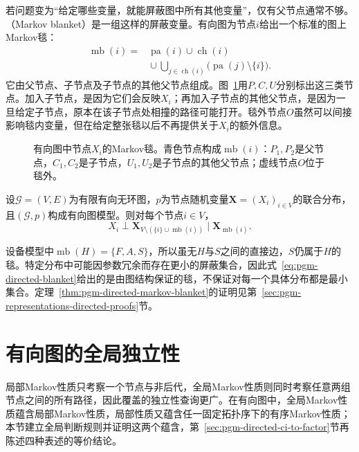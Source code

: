 若问题变为“给定哪些变量，就能屏蔽图中所有其他变量”，仅有父节点通常不够。（Markov blanket）是一组这样的屏蔽变量。有向图为节点$i$给出一个标准的图上Markov毯：
\begin{equation}
  \begin{aligned}
    \operatorname{mb}(i)
    ={}&\operatorname{pa}(i)\cup\operatorname{ch}(i)\\
       &{}\cup\bigcup_{j\in\operatorname{ch}(i)}
           \bigl(\operatorname{pa}(j)\setminus\{i\}\bigr).
  \end{aligned}
  \label{eq:pgm-directed-blanket}
\end{equation}
它由父节点、子节点及子节点的其他父节点组成。图~\ref{fig:pgm-directed-markov-blanket}用$P,C,U$分别标出这三类节点。加入子节点，是因为它们会反映$X_i$；再加入子节点的其他父节点，是因为一旦给定子节点，原本在该子节点处相撞的路径可能打开。毯外节点$O$虽然可以间接影响毯内变量，但在给定整张毯以后不再提供关于$X_i$的额外信息。

\begin{figure}[htbp]
  \centering
  
  \caption{有向图中节点$X_i$的Markov毯。青色节点构成$\operatorname{mb}(i)$：$P_1,P_2$是父节点，$C_1,C_2$是子节点，$U_1,U_2$是子节点的其他父节点；虚线节点$O$位于毯外。}
  \label{fig:pgm-directed-markov-blanket}
\end{figure}

\begin{theorem}[有向图中的Markov毯]
  \label{thm:pgm-directed-markov-blanket}
  设$\mathcal{G}=(V,E)$为有限有向无环图，$p$为节点随机变量$\bm{X}=(X_i)_{i\in V}$的联合分布，且$(\mathcal{G},p)$构成有向图模型。则对每个节点$i\in V$，
  \[
    X_i\perp
    \bm{X}_{V\setminus(\{i\}\cup\operatorname{mb}(i))}
    \mid\bm{X}_{\operatorname{mb}(i)}.
  \]
\end{theorem}

设备模型中$\operatorname{mb}(H)=\{F,A,S\}$，所以虽无$H$与$S$之间的直接边，$S$仍属于$H$的毯。特定分布中可能因参数冗余而存在更小的屏蔽集合，因此式~\eqref{eq:pgm-directed-blanket}给出的是由图结构保证的毯，不保证对每一个具体分布都是最小集合。定理~\ref{thm:pgm-directed-markov-blanket}的证明见第~\ref{sec:pgm-representations-directed-proofs}节。

\section{有向图的全局独立性}
\label{sec:pgm-directed-global}

局部Markov性质只考察一个节点与非后代，全局Markov性质则同时考察任意两组节点之间的所有路径，因此覆盖的独立性查询更广。在有向图中，全局Markov性质蕴含局部Markov性质，局部性质又蕴含任一固定拓扑序下的有序Markov性质；本节建立全局判断规则并证明这两个蕴含，第~\ref{sec:pgm-directed-ci-to-factor}节再陈述四种表述的等价结论。

